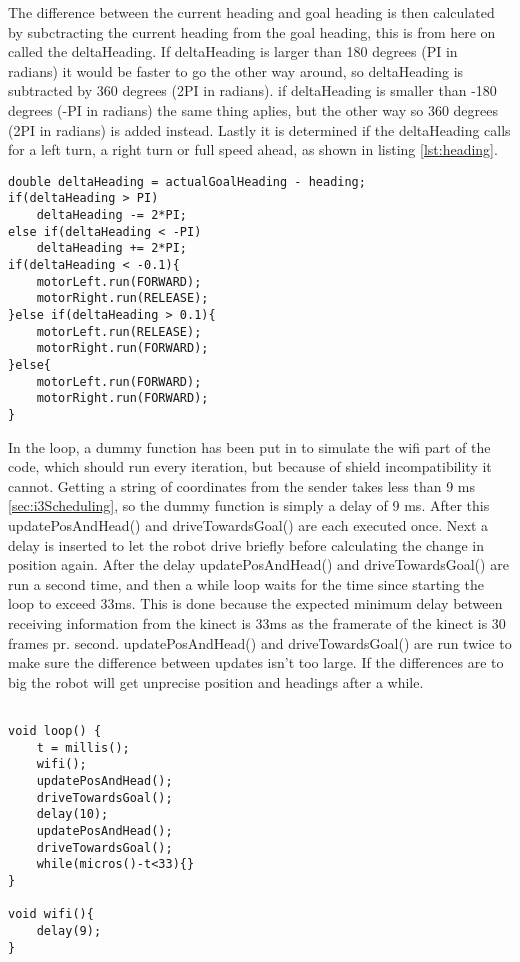 The difference between the current heading and goal heading is then calculated by subctracting the current heading from the goal heading, this is from here on called the deltaHeading. \newline
If deltaHeading is larger than 180 degrees (PI in radians) it would be faster to go the other way around, so deltaHeading is subtracted by 360 degrees (2PI in radians). \newline
if deltaHeading is smaller than -180 degrees (-PI in radians) the same thing aplies, but the other way so 360 degrees (2PI in radians) is added instead. \newline
Lastly it is determined if the deltaHeading calls for a left turn, a right turn or full speed ahead, as shown in listing \ref{lst:heading}.

\begin{lstlisting}[caption={Check the difference of the actualGoalHeading and its current heading, and determines which motors to run}, label={lst:heading}]
double deltaHeading = actualGoalHeading - heading;
if(deltaHeading > PI)
	deltaHeading -= 2*PI;
else if(deltaHeading < -PI)
	deltaHeading += 2*PI;
if(deltaHeading < -0.1){
	motorLeft.run(FORWARD);
	motorRight.run(RELEASE);
}else if(deltaHeading > 0.1){
	motorLeft.run(RELEASE);
	motorRight.run(FORWARD);
}else{
	motorLeft.run(FORWARD);
	motorRight.run(FORWARD);
}
\end{lstlisting}

In the loop, a dummy function has been put in to simulate the wifi part of the code, which should run every iteration, but because of shield incompatibility it cannot. Getting a string of coordinates from the sender takes less than 9 ms \ref{sec:i3Scheduling}, so the dummy function is simply a delay of 9 ms. After this updatePosAndHead() and driveTowardsGoal() are each executed once. Next a delay is inserted to let the robot drive briefly before calculating the change in position again. After the delay updatePosAndHead() and driveTowardsGoal() are run a second time, and then a while loop waits for the time since starting the loop to exceed 33ms. This is done because the expected minimum delay between receiving information from the kinect is 33ms as the framerate of the kinect is 30 frames pr. second. updatePosAndHead() and driveTowardsGoal() are run twice to make sure the difference between updates isn't too large. If the differences are to big the robot will get unprecise position and headings after a while.

\begin{lstlisting}[caption={Loop function}, label={lst:loop}]

void loop() {
	t = millis();
	wifi();
	updatePosAndHead();
	driveTowardsGoal();  
	delay(10);
	updatePosAndHead();
	driveTowardsGoal();
	while(micros()-t<33){}  
}

void wifi(){
	delay(9);
}
\end{lstlisting}

